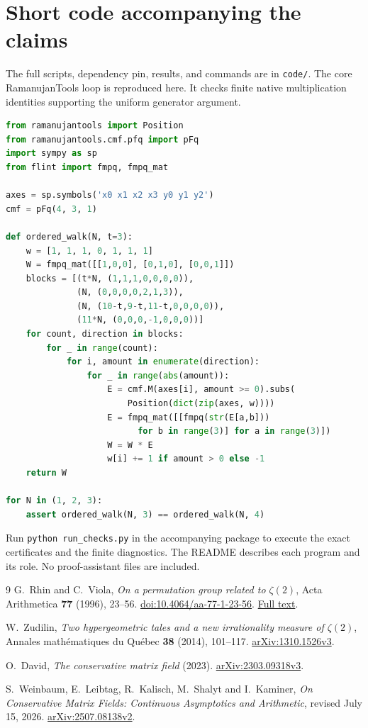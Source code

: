 \documentclass[11pt]{article}
\begin{document}
\section{Short code accompanying the claims}
The full scripts, dependency pin, results, and commands are in
\texttt{code/}. The core RamanujanTools loop is reproduced here.
It checks finite native multiplication identities supporting the uniform generator argument.
\begin{lstlisting}[language=Python]
from ramanujantools import Position
from ramanujantools.cmf.pfq import pFq
import sympy as sp
from flint import fmpq, fmpq_mat

axes = sp.symbols('x0 x1 x2 x3 y0 y1 y2')
cmf = pFq(4, 3, 1)

def ordered_walk(N, t=3):
    w = [1, 1, 1, 0, 1, 1, 1]
    W = fmpq_mat([[1,0,0], [0,1,0], [0,0,1]])
    blocks = [(t*N, (1,1,1,0,0,0,0)),
              (N, (0,0,0,0,2,1,3)),
              (N, (10-t,9-t,11-t,0,0,0,0)),
              (11*N, (0,0,0,-1,0,0,0))]
    for count, direction in blocks:
        for _ in range(count):
            for i, amount in enumerate(direction):
                for _ in range(abs(amount)):
                    E = cmf.M(axes[i], amount >= 0).subs(
                        Position(dict(zip(axes, w))))
                    E = fmpq_mat([[fmpq(str(E[a,b]))
                          for b in range(3)] for a in range(3)])
                    W = W * E
                    w[i] += 1 if amount > 0 else -1
    return W

for N in (1, 2, 3):
    assert ordered_walk(N, 3) == ordered_walk(N, 4)
\end{lstlisting}

Run \texttt{python run\_checks.py} in the accompanying package to
execute the exact certificates and the finite diagnostics. The README
describes each program and its role. No proof-assistant files are included.


\begin{thebibliography}{9}
G.~Rhin and C.~Viola,
\emph{On a permutation group related to $\zeta(2)$},
Acta Arithmetica \textbf{77} (1996), 23--56.
\href{https://doi.org/10.4064/aa-77-1-23-56}{doi:10.4064/aa-77-1-23-56}.
\href{https://www.math.ru.nl/~zudilin/zw/Rhin-Viola_AA_1996.pdf}{Full text}.

W.~Zudilin,
\emph{Two hypergeometric tales and a new irrationality measure of $\zeta(2)$},
Annales math\'ematiques du Qu\'ebec \textbf{38} (2014), 101--117.
\href{https://arxiv.org/abs/1310.1526v3}{arXiv:1310.1526v3}.

O.~David,
\emph{The conservative matrix field} (2023).
\href{https://arxiv.org/abs/2303.09318v3}{arXiv:2303.09318v3}.

S.~Weinbaum, E.~Leibtag, R.~Kalisch, M.~Shalyt and I.~Kaminer,
\emph{On Conservative Matrix Fields: Continuous Asymptotics and Arithmetic},
revised July 15, 2026.
\href{https://arxiv.org/abs/2507.08138v2}{arXiv:2507.08138v2}.
\end{thebibliography}
\end{document}
